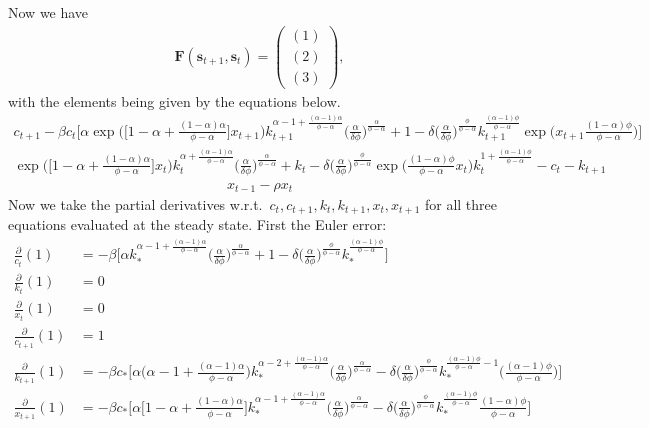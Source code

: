 \documentclass[a4paper]{article}
\theoremstyle{definition}
\begin{document}
Now we have
	\begin{align*}
	\mathbf F(\mathbf s_{t+1},\mathbf s_{t}) = 
		\begin{pmatrix}
		(1) \\ (2) \\ (3)
		\end{pmatrix},	
	\end{align*}	
with the elements being given by the equations below.
	\begin{align}
	c_{t+1}-\beta c_{t} \bigg[\alpha \exp\Big( \big[1-\alpha+\frac{(1-\alpha)\alpha}{\phi-\alpha} \big] x_{t+1} \Big) k_{t+1}^{\alpha-1+\frac{(\alpha-1)\alpha}{\phi-\alpha}}\Big( \frac{\alpha}{\delta\phi}\Big)^{\frac{\alpha}{\phi-\alpha}}+1-\delta \Big( \frac{\alpha}{\delta\phi}\Big)^{\frac{\phi}{\phi-\alpha}}k_{t+1}^{\frac{(\alpha-1)\phi}{\phi-\alpha}}\exp\Big(x_{t+1}\frac{(1-\alpha)\phi}{\phi-\alpha}\Big) \bigg]
	\end{align}
	\begin{align}
	\exp\Big( \Big[ 1-\alpha+\frac{(1-\alpha)\alpha}{\phi-\alpha} \Big]x_{t} \Big)k_{t}^{\alpha+\frac{(\alpha-1)\alpha}{\phi-\alpha}} \Big( \frac{\alpha}{\delta\phi}\Big)^{\frac{\alpha}{\phi-\alpha}}+k_{t}-\delta \Big( \frac{\alpha}{\delta\phi}\Big)^{\frac{\phi}{\phi-\alpha}}\exp\Big( \frac{(1-\alpha)\phi}{\phi-\alpha}x_{t} \Big)k_{t}^{1+\frac{(\alpha-1)\phi}{\phi-\alpha}}-c_{t}-k_{t+1}
	\end{align}
	\begin{align}
	x_{t-1} - \rho x_{t}
	\end{align}
Now we take the partial derivatives w.r.t.\ $c_{t},c_{t+1},k_{t},k_{t+1},x_{t},x_{t+1}$ for all three equations evaluated at the steady state. First the Euler error:
	\begin{align*}
	\frac{\partial}{c_{t}}(1) 		&= -\beta\bigg[\alpha  k_{*}^{\alpha-1+\frac{(\alpha-1)\alpha}{\phi-\alpha}}\Big( \frac{\alpha}{\delta\phi}\Big)^{\frac{\alpha}{\phi-\alpha}}+1-\delta \Big( \frac{\alpha}{\delta\phi}\Big)^{\frac{\phi}{\phi-\alpha}}k_{*}^{\frac{(\alpha-1)\phi}{\phi-\alpha}} \bigg] \\
	\frac{\partial}{k_{t}}(1) 		&= 0\\
	\frac{\partial}{x_{t}}(1) 		&= 0\\
	\frac{\partial}{c_{t+1}}(1) 	&= 1\\			
	\frac{\partial}{k_{t+1}}(1) 	&= -\beta c_{*} \bigg[\alpha \Big( \alpha-1+\frac{(\alpha-1)\alpha}{\phi-\alpha} \Big) k_{*}^{\alpha-2+\frac{(\alpha-1)\alpha}{\phi-\alpha}}\Big( \frac{\alpha}{\delta\phi}\Big)^{\frac{\alpha}{\phi-\alpha}}-\delta \Big( \frac{\alpha}{\delta\phi}\Big)^{\frac{\phi}{\phi-\alpha}}k_{*}^{\frac{(\alpha-1)\phi}{\phi-\alpha}-1}\Big( \frac{(\alpha-1)\phi}{\phi-\alpha}\Big) \bigg]\\
	\frac{\partial}{x_{t+1}}(1) 	&= -\beta c_{*}\bigg[\alpha \big[1-\alpha+\frac{(1-\alpha)\alpha}{\phi-\alpha} \big] k_{*}^{\alpha-1+\frac{(\alpha-1)\alpha}{\phi-\alpha}}\Big( \frac{\alpha}{\delta\phi}\Big)^{\frac{\alpha}{\phi-\alpha}}-\delta \Big( \frac{\alpha}{\delta\phi}\Big)^{\frac{\phi}{\phi-\alpha}}k_{*}^{\frac{(\alpha-1)\phi}{\phi-\alpha}}\frac{(1-\alpha)\phi}{\phi-\alpha} \bigg]
	\end{align*}
\end{document}
